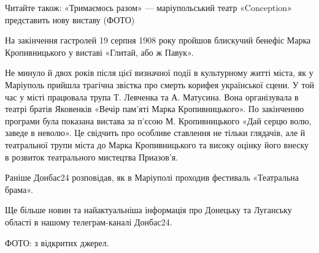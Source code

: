Читайте також: «Тримаємось разом» — маріупольський театр «Conception»
представить нову виставу (ФОТО)

На закінчення гастролей 19 серпня 1908 року пройшов блискучий бенефіс Марка
Кропивницького у виставі «Глитай, або ж Павук».

Не минуло й двох років після цієї визначної події в культурному житті міста, як
у Маріуполь прийшла трагічна звістка про смерть корифея української сцени. У
той час у місті працювала трупа Т. Левченка та А. Матусина. Вона організувала в
театрі братів Яковенків «Вечір пам'яті Марка Кропивницького». По закінченню
програми була показана вистава за п'єсою М. Кропивницького «Дай серцю волю,
заведе в неволю». Це свідчить про особливе ставлення не тільки глядачів, але й
театральної трупи міста до Марка Кропивницького та високу оцінку його внеску в
розвиток театрального мистецтва Приазов'я.

Раніше Донбас24 розповідав, як в Маріуполі проходив фестиваль «Театральна
брама».

Ще більше новин та найактуальніша інформація про Донецьку та Луганську області
в нашому телеграм-каналі Донбас24.

ФОТО: з відкритих джерел.
